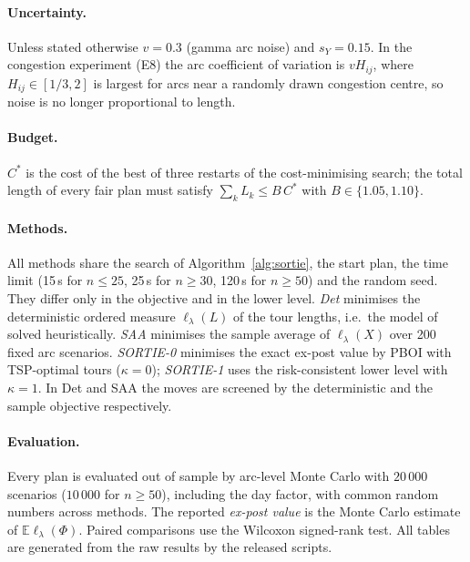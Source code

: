 \documentclass[11pt]{article}
\theoremstyle{definition}
\newcommand{\E}{\mathbb{E}}
\newcommand{\lord}{\ell_\lambda}
\begin{document}
\paragraph{Uncertainty.} Unless stated otherwise $v=0.3$ (gamma arc noise) and
$s_Y=0.15$. In the congestion experiment (E8) the arc coefficient of variation
is $vH_{ij}$, where $H_{ij}\in[1/3,2]$ is largest for arcs near a randomly
drawn congestion centre, so noise is no longer proportional to length.

\paragraph{Budget.} $C^\ast$ is the cost of the best of three restarts of
the cost-minimising search; the total length of every fair plan must satisfy
$\sum_k L_k\le B\,C^\ast$ with $B\in\{1.05,1.10\}$.

\paragraph{Methods.} All methods share the search of Algorithm~\ref{alg:sortie},
the start plan, the time limit (15\,s for $n\le25$, 25\,s for $n\ge30$, 120\,s
for $n\ge50$) and the random seed. They differ only in the objective and in the
lower level.
\emph{Det} minimises the deterministic ordered measure $\lord(L)$ of the tour
lengths, i.e.\ the model of \citet{ljubic2026fair} solved heuristically.
\emph{SAA} minimises the sample average of $\lord(X)$ over 200 fixed arc
scenarios. \emph{SORTIE-0} minimises the exact ex-post value by PBOI with
TSP-optimal tours ($\kappa=0$); \emph{SORTIE-1} uses the risk-consistent lower
level with $\kappa=1$. In Det and SAA the moves are screened by the
deterministic and the sample objective respectively.

\paragraph{Evaluation.} Every plan is evaluated out of sample by arc-level
Monte Carlo with $20\,000$ scenarios ($10\,000$ for $n\ge 50$), including the
day factor, with common random numbers across methods. The reported
\emph{ex-post value} is the Monte Carlo estimate of $\E\lord(\Phi)$. Paired
comparisons use the Wilcoxon signed-rank test. All tables are generated from
the raw results by the released scripts.
\end{document}
